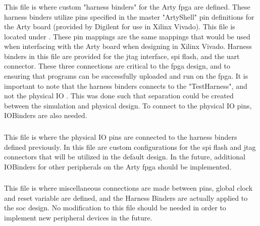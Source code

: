 \subsubsection{}\label{sec:Customizing_FPGA-HarnessBinders.scala}
This file is where custom "harness binders" for the Arty \Gls{fpga} are defined. 
These harness binders utilize pins specified in the master "ArtyShell" pin definitions for the Arty board (provided by Digilent for use in Xilinx Vivado). 
This file is located under . These pin mappings are the same mappings that would be used when interfacing with the Arty board when designing in Xilinx Vivado. 
Harness binders in this file are provided for the \Gls{jtag} interface, \Gls{spi} flash, and the \Gls{uart}  connector. These three connections are critical to the \Gls{fpga} design, and to ensuring that programs can be successfully uploaded and run on the \Gls{fpga}. 
It is important to note that the harness binders connects to the "TestHarness", and not the physical IO \cite{Chipyard_IO}. 
This was done such that separation could be created between the simulation and physical design. 
To connect to the physical IO pins, IOBinders are also needed.

\subsubsection{}\label{sec:Customizing_FPGA-IOBinders.scala}
This file is where the physical IO pins are connected to the harness binders defined previously. 
In this file are custom configurations for the \Gls{spi} flash and \Gls{jtag} connectors that will be utilized in the default design. 
In the future, additional IOBinders for other peripherals on the Arty \Gls{fpga} should be implemented.

\subsubsection{}\label{sec:Customizing_FPGA-TestHarness.scala}
This file is where miscellaneous connections are made between pins, global clock and reset variable are defined, and the Harness Binders are actually applied to the \Gls{soc} design. No modification to this file should be needed in order to implement new peripheral devices in the future.


